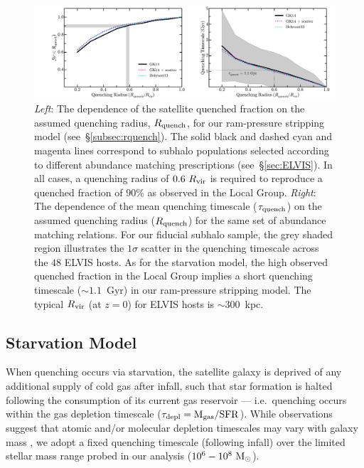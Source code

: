 \begin{figure}
  \centering
  \hspace*{-0.42in}
  \includegraphics[width=6.5in]{ch1_f4.pdf}
  \caption{\emph{Left}: The dependence of the satellite quenched
    fraction on the assumed quenching radius, $R_{\rm quench}$, for our
    ram-pressure stripping model (see~\S\ref{subsec:rquench}). The
    solid black and dashed cyan and magenta lines correspond to subhalo
    populations selected according to different abundance matching
    prescriptions (see~\S\ref{sec:ELVIS}). In all cases, a quenching
    radius of $0.6~R_{\rm vir}$ is required to reproduce a quenched
    fraction of $90\%$ as observed in the Local Group. \emph{Right}:
    The dependence of the mean quenching timescale ($\tau_{\rm
      quench}$) on the assumed quenching radius ($R_{\rm quench}$) for
    the same set of abundance matching relations. For our fiducial
    subhalo sample, the grey shaded region illustrates the $1\sigma$
    scatter in the quenching timescale across the $48$ ELVIS hosts. As
    for the starvation model, the high observed quenched fraction in
    the Local Group implies a short quenching timescale ($\sim1.1$~Gyr)
    in our ram-pressure stripping model. The typical $R_{\rm vir}$ (at
    $z=0$) for ELVIS hosts is $\sim300$~kpc.}
  \label{fig:rquench}
\end{figure}



\subsection{Starvation Model}
\label{subsec:tquench}

When quenching occurs via starvation, the satellite galaxy is deprived
of any additional supply of cold gas after infall, such that star
formation is halted following the consumption of its current gas
reservoir --- i.e.~quenching occurs within the gas depletion timescale
($\tau_{\rm depl} = {\rm M}_{\rm gas} / {\rm SFR}$). While
observations suggest that atomic and/or molecular depletion timescales
may vary with galaxy mass \citep{leroy08, bigiel11, boselli14,
  somerville15}, we adopt a fixed quenching timescale (following infall)
over the limited stellar mass range probed in our analysis
($10^{6}-10^{8}~{\rm M}_{\odot}$).




